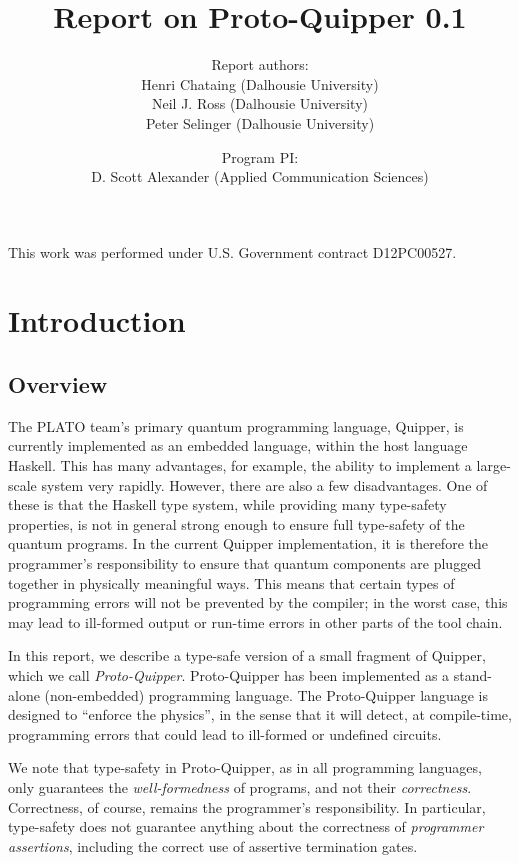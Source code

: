 \documentclass[twoside]{article}
\title{Report on Proto-Quipper 0.1}
\author{Report authors: \\
  Henri Chataing (Dalhousie University)\\
  Neil J. Ross (Dalhousie University)\\
  Peter Selinger (Dalhousie University)
}
\date{Program PI:\\
  D. Scott Alexander (Applied Communication Sciences)}
\begin{document}
\maketitle
\thispagestyle{fancy}

This work was performed under U.S. Government contract D12PC00527.

\tableofcontents

\clearpage
\section{Introduction}

\subsection{Overview}

The PLATO team's primary quantum programming language, Quipper, is
currently implemented as an embedded language, within the host
language Haskell. This has many advantages, for example, the ability
to implement a large-scale system very rapidly. However, there are
also a few disadvantages. One of these is that the Haskell type
system, while providing many type-safety properties, is not in general
strong enough to ensure full type-safety of the quantum programs. In
the current Quipper implementation, it is therefore the programmer's
responsibility to ensure that quantum components are plugged together
in physically meaningful ways. This means that certain types of
programming errors will not be prevented by the compiler; in the worst
case, this may lead to ill-formed output or run-time errors in other
parts of the tool chain.

In this report, we describe a type-safe version of a small fragment of
Quipper, which we call {\em Proto-Quipper}. Proto-Quipper has been
implemented as a stand-alone (non-embedded) programming language.  The
Proto-Quipper language is designed to ``enforce the physics'', in the
sense that it will detect, at compile-time, programming errors that
could lead to ill-formed or undefined circuits.  

We note that type-safety in Proto-Quipper, as in all programming
languages, only guarantees the {\em well-formedness} of programs, and
not their {\em correctness}. Correctness, of course, remains the
programmer's responsibility. In particular, type-safety does not
guarantee anything about the correctness of {\em programmer
  assertions}, including the correct use of assertive termination
gates. 
\end{document}

